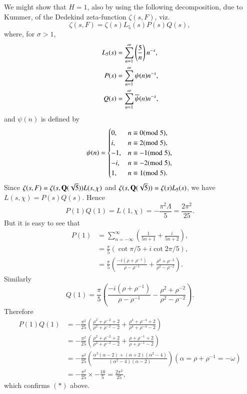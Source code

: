 We might show that $H=1$, also by using the following decomposition,
due to Kummer, of the Dedekind zeta-function $\zeta(s,F)$, viz.
$$
\zeta(s,F)=\zeta(s)L_{5}(s)P(s)Q(s),
$$
where, for $\sigma>1$,
\begin{align*}
L_{5}(s) &= \sum^{\infty}_{n=1}\left(\frac{5}{n}\right)n^{-s},\\
P(s) &= \sum^{\infty}_{n=1}\psi(n)n^{-s},\\
Q(s) &= \sum^{\infty}_{n=1}\overline{\psi}(n)n^{-s},
\end{align*}
and $\psi(n)$ is defined by
$$
\psi(n)=
\begin{cases}
0, & n\equiv 0 (\rm{mod} \; 5),\\
i, & n\equiv 2(\rm{mod} \; 5),\\
-1, & n\equiv -1(\rm{mod} \; 5),\\
-i, & n\equiv -2(\rm{mod} \; 5),\\
1, & n\equiv 1(\rm{mod} \; 5).
\end{cases}
$$
Since $\zeta(s,F)=\zeta(s,\mathbf{Q}(\sqrt{5}))L(s,\chi)$ and
$\zeta(s,\mathbf{Q}(\sqrt{5}))=\zeta(s)L_{5}(s)$, we have
$L(s,\chi)=P(s)Q(s)$. Hence 
\begin{equation*}
P(1)Q(1)=L(1,\chi)=-\frac{\pi^{2}\Lambda}{5}=\frac{2\pi^{2}}{25}.\tag{$\ast$}
\end{equation*}\pageoriginale
But it is easy to see that
\begin{align*}
P(1) &=
\sum^{\infty}_{n=-\infty}\left(\frac{1}{5n+1}+\frac{i}{5n+2}\right),\\
&= \frac{\pi}{5}(\cot\pi/5+i\cot 2\pi/5),\\
&=
\frac{\pi}{5}\left(\frac{-i(\rho+\rho^{-1})}{\rho-\rho^{-1}}+\frac{\rho^{2}+\rho^{-2}}{\rho^{2}-\rho^{-2}}\right). 
\end{align*}
Similarly
$$
Q(1)=\frac{\pi}{5}\left(\frac{-i(\rho+\rho^{-1})}{\rho-\rho^{-1}}-\frac{\rho^{2}+\rho^{-2}}{\rho^{2}-\rho^{-2}}\right). 
$$
Therefore
\begin{align*}
P(1)Q(1) &=
-\frac{\pi^{2}}{25}\left(\frac{\rho^{2}+\rho^{-2}+2}{\rho^{2}+\rho^{-2}-2}+\frac{\rho^{4}+\rho^{-4}+2}{\rho^{4}+\rho^{-4}-2}\right)\\
&=
-\frac{\pi^{2}}{25}\left(\frac{\rho^{2}+\rho^{-2}+2}{\rho^{2}+\rho^{-2}-2}+\frac{\rho+\rho^{-1}+2}{\rho+\rho^{-1}-2}\right)\\
&=
-\frac{\pi^{2}}{25}\left(\frac{\alpha^{2}(\alpha-2)+(\alpha+2)(\alpha^{2}-4)}{(\alpha^{2}-4)(\alpha-2)}\right)(\alpha=\rho+\rho^{-1}=-\omega)\\
&= -\frac{\pi^{2}}{25}\times-\frac{10}{5}=\frac{2\pi^{2}}{25},
\end{align*}
which confirms $(\ast)$ above.

